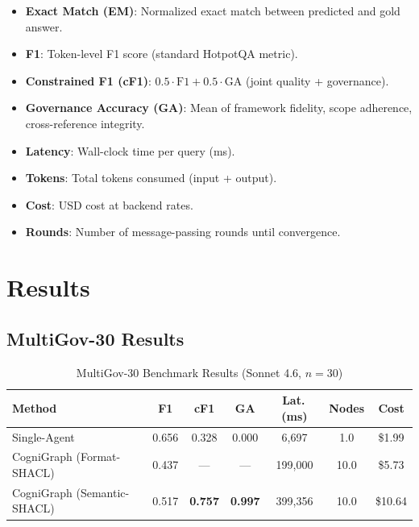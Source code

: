 \documentclass[a4paper,11pt]{article}
\theoremstyle{definition}
\begin{document}
\begin{itemize}
\item \textbf{Exact Match (EM)}: Normalized exact match between predicted and gold answer.
\item \textbf{F1}: Token-level F1 score (standard HotpotQA metric).
\item \textbf{Constrained F1 (cF1)}: $0.5 \cdot \mathrm{F1} + 0.5 \cdot \mathrm{GA}$ (joint quality + governance).
\item \textbf{Governance Accuracy (GA)}: Mean of framework fidelity, scope adherence, cross-reference integrity.
\item \textbf{Latency}: Wall-clock time per query (ms).
\item \textbf{Tokens}: Total tokens consumed (input + output).
\item \textbf{Cost}: USD cost at backend rates.
\item \textbf{Rounds}: Number of message-passing rounds until convergence.
\end{itemize}

\section{Results}
\label{sec:results}

\subsection{MultiGov-30 Results}

\begin{table}[ht]
\centering
\caption{MultiGov-30 Benchmark Results (Sonnet 4.6, $n=30$)}
\label{tab:multigov_results}
\begin{tabular}{lcccccc}
\toprule
\textbf{Method} & \textbf{F1} & \textbf{cF1} & \textbf{GA} & \textbf{Lat.\,(ms)} & \textbf{Nodes} & \textbf{Cost} \\
\midrule
Single-Agent & 0.656 & 0.328 & 0.000 & 6,697 & 1.0 & \$1.99 \\
CogniGraph (Format-SHACL) & 0.437 & --- & --- & 199,000 & 10.0 & \$5.73 \\
CogniGraph (Semantic-SHACL) & 0.517 & \textbf{0.757} & \textbf{0.997} & 399,356 & 10.0 & \$10.64 \\
\bottomrule
\end{tabular}
\end{table}
\end{document}
